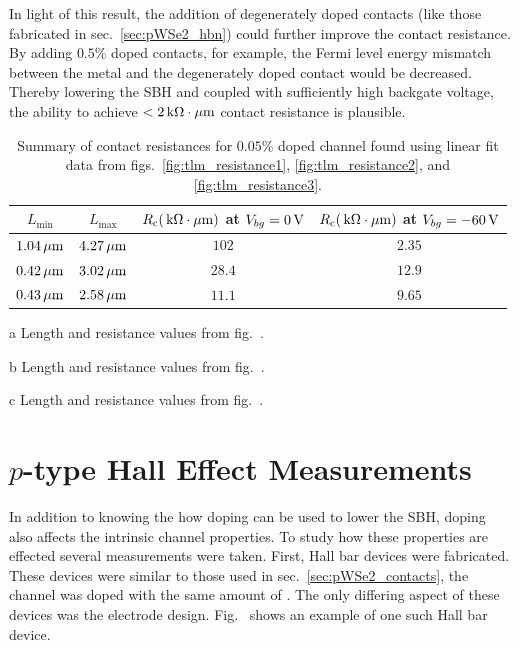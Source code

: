 \noindent In light of this result, the addition of degenerately doped contacts (like those fabricated in sec.~\ref{sec:pWSe2_hbn}) could further improve the contact resistance. By adding $0.5\%$  doped  contacts, for example, the Fermi level energy mismatch between the metal and the degenerately doped  contact would be decreased. Thereby lowering the \acs{SBH} and coupled with sufficiently high backgate voltage, the ability to achieve $< 2\,\mathrm{k\Omega\cdot\mu m}$ contact resistance is plausible. 
\begin{table}[ht]
	\centering
	\begin{threeparttable}
		\begin{tabular}{c c c c}
			\hline\hline
			$L_\mathrm{min}$ & $L_\mathrm{max}$ & $R_\mathrm{c}(\,\mathrm{k\Omega\cdot\mu m})$ at $V_{bg}=0\,\mathrm{V}$ & $R_\mathrm{c}(\,\mathrm{k\Omega\cdot\mu m})$ at $V_{bg}=-60\,\mathrm{V}$ \\ [0.5ex]
			\hline
			$1.04\,\mathrm{\mu m}$ & $4.27\,\mathrm{\mu m}$ & $102$\tnote{a} & $2.35$\tnote{a}\\
			$0.42\,\mathrm{\mu m}$ & $3.02\,\mathrm{\mu m}$ & $28.4$\tnote{b} & $12.9$\tnote{b}\\
			$0.43\,\mathrm{\mu m}$ & $2.58\,\mathrm{\mu m}$ & $11.1$\tnote{c} & $9.65$\tnote{c}\\ [1ex]
			\hline
		\end{tabular}
		\begin{tablenotes}
			\item[a] Length and resistance values from fig.~.
			\item[b] Length and resistance values from fig.~.
			\item[c] Length and resistance values from fig.~.
		\end{tablenotes}
	\caption[Summary of contact resistances for $0.05\%$  doped  channel]{Summary of contact resistances for $0.05\%$  doped  channel found using linear fit data from figs.~\ref{fig:tlm_resistance1}, \ref{fig:tlm_resistance2}, and \ref{fig:tlm_resistance3}.}
	\label{table:contact_summary}
	\end{threeparttable}
\end{table}

\section{$p$-type  Hall Effect Measurements}\label{sec:pWSe2_hall}
In addition to knowing the how doping can be used to lower the \acs{SBH}, doping also affects the intrinsic channel properties. To study how these properties are effected several measurements were taken. First, Hall bar devices were fabricated. These devices were similar to those used in sec.~\ref{sec:pWSe2_contacts}, the channel was doped with the same amount of . The only differing aspect of these devices was the electrode design. Fig.~ shows an example of one such Hall bar device. \\ \\

